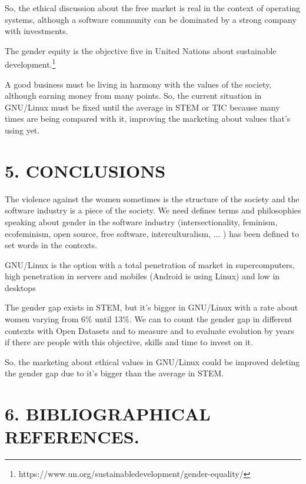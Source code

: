 \documentclass[fleqn,10pt,lineno]{wlpeerj} %
\begin{document}
So, the ethical discussion about the free market is real in the
context of operating systems, although a software community can be
dominated by a strong company with investments.

The gender equity is the objective five in United Nations about
sustainable
development.\footnote{https://www.un.org/sustainabledevelopment/gender-equality/}

A good business must be living in harmony
with the values of the society, although earning money from many
points. So, the current situation in GNU/Linux must be fixed until the
average in STEM or TIC because many times are being compared with it,
improving the marketing about values that's using yet.

\section*{5. CONCLUSIONS}

The violence against the women sometimes is the structure of the
society and the software industry is a piece of the society. We need
defines terms and philosophies speaking about gender in the software
industry (intersectionality, feminism, ecofeminism, open source, free
software, interculturalism, ... ) has been defined to set words in the
contexts.

GNU/Linux is the option with a total penetration of market in
supercomputers, high penetration in servers and mobiles (Android is
using Linux) and low in desktops

The gender gap exists in STEM, but it's bigger in GNU/Linux with a
rate about women varying from 6\% until 13\%. We can to count the
gender gap in different contexts with Open Datasets and to measure and
to evaluate evolution by years if there are people with this
objective, skills and time to invest on it.

So, the marketing about ethical values in GNU/Linux could be improved
deleting the gender gap due to it's bigger than the average in STEM.

\section*{6. BIBLIOGRAPHICAL REFERENCES.}


\end{document}
